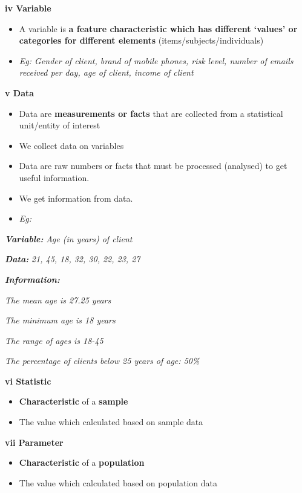\documentclass[]{book}
\providecommand{\tightlist}{%
  \setlength{\itemsep}{0pt}\setlength{\parskip}{0pt}}
\begin{document}
\textbf{iv Variable}

\begin{itemize}
\tightlist
\item
  A variable is \textbf{a feature characteristic which has different `values' or categories for different elements} (items/subjects/individuals)
\item
  \emph{Eg: Gender of client, brand of mobile phones, risk level, number of emails received per day, age of client, income of client}
\end{itemize}

\textbf{v Data}

\begin{itemize}
\item
  Data are \textbf{measurements or facts} that are collected from a statistical unit/entity of interest
\item
  We collect data on variables
\item
  Data are raw numbers or facts that must be processed (analysed) to get useful information.
\item
  We get information from data.
\item
  \emph{Eg:}
\end{itemize}

\textbf{\emph{Variable:}} \emph{Age (in years) of client}

\textbf{\emph{Data:}} \emph{21, 45, 18, 32, 30, 22, 23, 27}

\textbf{\emph{Information:}}

\emph{The mean age is 27.25 years}

\emph{The minimum age is 18 years}

\emph{The range of ages is 18-45}

\emph{The percentage of clients below 25 years of age: 50\%}

\textbf{vi Statistic}

\begin{itemize}
\tightlist
\item
  \textbf{Characteristic} of a \textbf{sample}
\item
  The value which calculated based on sample data
\end{itemize}

\textbf{vii Parameter}

\begin{itemize}
\tightlist
\item
  \textbf{Characteristic} of a \textbf{population}
\item
  The value which calculated based on population data
\end{itemize}
\end{document}
